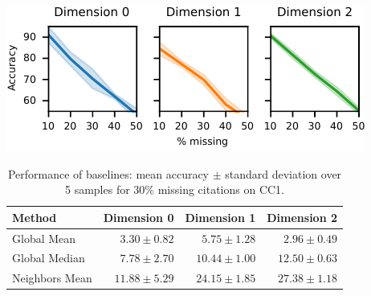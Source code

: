 \begin{table}[htbp]
  \centering
  \begin{minipage}[b]{0.35\linewidth}
    \includegraphics[width=\linewidth]{figures/foo-transfer.pdf}
    \label{fig:transfer-learning}
  \end{minipage}
  \hspace{0.5cm}
  \begin{minipage}[b]{0.56\linewidth}
    \scriptsize{\begin{tabular}{lrrr}
      \toprule
      Method & Dimension 0 & Dimension 1 & Dimension 2 \\
      \midrule
      Global Mean & $3.30\pm0.82$ & $5.75\pm1.28$ & $2.96\pm0.49$ \\
      Global Median & $7.78\pm2.70$ & $10.44\pm1.00$ & $12.50\pm0.63$ \\
      Neighbors Mean & $11.88\pm5.29$ & $24.15\pm1.85$ & $27.38\pm1.18$ \\
      \bottomrule
    \end{tabular}}
    \vspace{9pt}
	\caption{Performance of baselines: mean accuracy $\pm$ standard deviation over 5 samples for $30\%$ missing citations on CC1.}\label{tab:baselines}
  \end{minipage}
\end{table}

